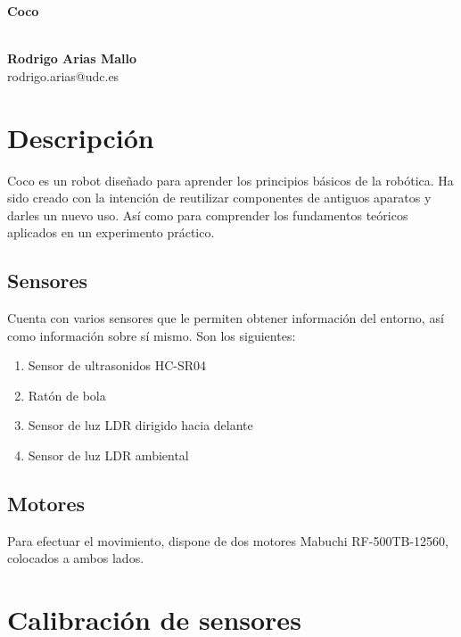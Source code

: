 \documentclass[10pt,a4paper,hidelinks]{article}
\begin{document}
\begin{center}
\begin{huge}
\textbf{Coco}
\end{huge}
\\[10pt]
\textbf{Rodrigo Arias Mallo}\\
rodrigo.arias@udc.es
\end{center}

\newcommand\RobotAngle{45}
\newcommand\RobotSize{2}
\newcommand\RobotRadius{4}
\newcommand\RobotThetaSonar{60.0}

\begin{multicols}{2}

\section{Descripción}
Coco es un robot diseñado para aprender los principios básicos de la robótica.
Ha sido creado con la intención de reutilizar componentes de antiguos aparatos y 
darles un nuevo uso. Así como para comprender los fundamentos teóricos
aplicados en un experimento práctico.

\subsection{Sensores}
Cuenta con varios sensores que le permiten obtener información del entorno, así
como información sobre sí mismo. Son los siguientes:

\begin{enumerate}
	\setlength{\parskip}{0cm}

	\item Sensor de ultrasonidos HC-SR04
	\item Ratón de bola
	\item Sensor de luz LDR dirigido hacia delante
	\item Sensor de luz LDR ambiental
\end{enumerate}

\subsection{Motores}
Para efectuar el movimiento, dispone de dos motores Mabuchi RF-500TB-12560, 
colocados a ambos lados.


\section{Calibración de sensores}

\end{multicols}
\end{document}
